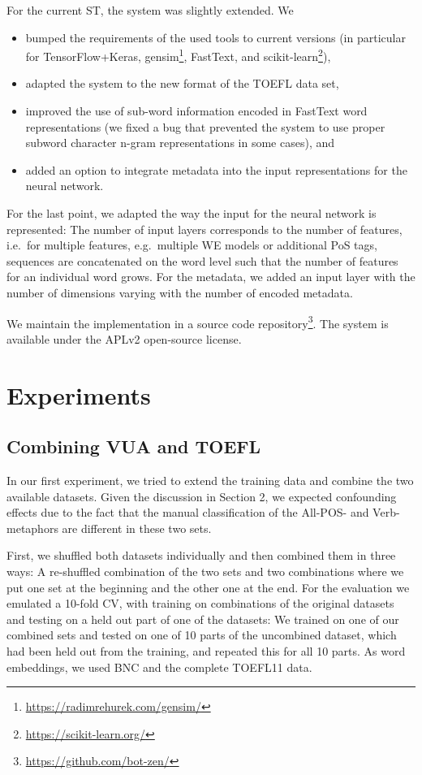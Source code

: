 \documentclass[11pt,a4paper]{article}
\begin{document}
For the current ST, the system was slightly extended. We
\begin{itemize}
\item bumped the requirements of the used tools to current versions (in particular for TensorFlow+Keras, gensim\footnote{\url{https://radimrehurek.com/gensim/}}, FastText, and scikit-learn\footnote{\url{https://scikit-learn.org/}}),
\item adapted the system to the new format of the TOEFL data set,
\item improved the use of sub-word information encoded in FastText word representations 
(we fixed a bug that prevented the system to use proper subword character n-gram representations in some cases), and
\item added an option to integrate metadata into the input representations for the neural network.
\end{itemize}

For the last point, we adapted the way the input for the neural network is represented: 
The number of input layers corresponds to the number of features, i.e.~for multiple features, e.g.~multiple WE models or additional PoS tags, sequences are concatenated on the word level such that the number of features for an individual word grows.
For the metadata, we added an input layer with the number of dimensions varying with the number of encoded metadata.

We maintain the implementation in a source code repository\footnote{\url{https://github.com/bot-zen/}}.
The system is available under the APLv2 open-source license.

\section{Experiments}

\subsection{Combining VUA and TOEFL}
In our first experiment, we tried to extend the training data and combine the two available datasets. 
Given the discussion in Section 2, we expected confounding effects due to the fact that the manual classification of the All-POS- and Verb-metaphors are different in these two sets. 

First, we shuffled both datasets individually and then combined them in three ways: A re-shuffled combination of the two sets and two combinations where we put one set at the beginning and the other one at the end. For the evaluation we emulated a 10-fold CV, with training on combinations of the original datasets and testing on a held out part of one of the datasets: We trained on one of our combined sets and tested on one of 10 parts of the uncombined dataset, which had been held out from the training, and repeated this for all 10 parts.
As word embeddings, we used BNC and the complete TOEFL11 data.
\end{document}
